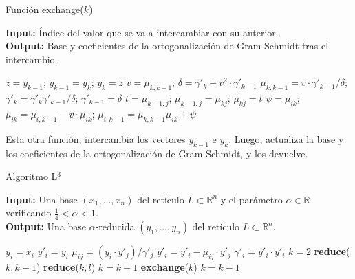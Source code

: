     \begin{algorithm}[H]
        \caption{Función exchange($k$)}
        \textbf{Input:} Índice del valor que se va a intercambiar con su anterior. \\
        \textbf{Output:} Base y coeficientes de la ortogonalización de Gram-Schmidt tras el intercambio. 
        \bigskip
        \begin{algorithmic}[1]
            \State $z = y_{k-1}$; $y_{k-1} = y_{k}$; $y_{k} = z$
            \State $v = \mu_{k, k+1}$; $\delta = \gamma'_{k} + v^{2} \cdot \gamma'_{k-1}$ 
            \State $\mu_{k, k-1} = v \cdot \gamma'_{k-1} / \delta$; $\gamma'_{k} = \gamma'_{k}\gamma'_{k-1}/\delta$; $\gamma'_{k-1} = \delta$
            \State $t = \mu_{k-1, j}$; $\mu_{k-1, j} = \mu_{kj}$; $\mu_{kj} = t$
            \EndFor
            \State $\psi = \mu_{ik}$; $\mu_{ik} = \mu_{i, k-1} - v \cdot \mu_{ik}$; $\mu_{i,k-1} = \mu_{k, k-1}\mu_{ik} + \psi$
            \EndFor
        \end{algorithmic}
    \end{algorithm}

    Esta otra función, intercambia los vectores $y_{k-1}$ e $y_{k}$. Luego, actualiza la base y los coeficientes de la ortogonalización de Gram-Schmidt, y los devuelve.

    \begin{algorithm}[H]
        \caption{Algoritmo L$^{3}$}
        \textbf{Input:} Una base $(x_{1}, ... , x_{n})$ del retículo $L \subset \mathbb{R}^{n}$ y el parámetro $\alpha \in \mathbb{R}$ verificando $\frac{1}{4} < \alpha < 1$. \\
        \textbf{Output:} Una base $\alpha$-reducida $(y_{1}, ... , y_{n})$ del retículo $L \subset \mathbb{R}^{n}$.
        \bigskip
        \begin{algorithmic}[1]
            \State $y_{i} = x_{i}$
            \EndFor
            \State $y'_{i} = y_{i}$
            \State $\mu_{ij} = (y_{i} \cdot y'_{j}) / \gamma'_{j}$ 
            \State $y'_{i} = y'_{i} - \mu_{ij} \cdot y'_{j}$
            \EndFor
            \State $\gamma'_{i} = y'_{i} \cdot y'_{i}$
            \EndFor
            \State $k = 2$
            \State \textbf{reduce}($k, k-1$)
            \State \textbf{reduce}($k, l$)
            \EndFor
            \State $k = k+1$
            \Else
            \State \textbf{exchange}($k$)
            \State $k = k-1$
            \EndIf
            \EndIf
            \EndWhile
        \end{algorithmic}
    \end{algorithm}

